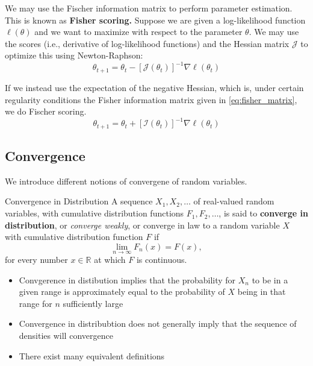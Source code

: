 \documentclass[11pt, %
	oneside, %
	english, %
	onehalfspacing, %
	]{article} %
\numberwithin{equation}{section}
\begin{document}
We may use the Fischer information matrix to perform parameter estimation. This is known as \textbf{Fisher scoring.} Suppose we are given a log-likelihood function $\ell(\theta)$ and we want to maximize with respect to the parameter $\theta$. We may use the scores (i.e., derivative of log-likelihood functions) and the Hessian matrix $\mathcal{J}$  to optimize this using Newton-Raphson:
\begin{equation*}
    \theta_{t+1}=\theta_t-\left[\mathcal{J}\left(\theta_t\right)\right]^{-1} \nabla \ell \left(\theta_t\right)
\end{equation*}

If we instead use the expectation of the negative Hessian, which is, under certain regularity conditions the Fisher information matrix given in \eqref{eq:fisher_matrix}, we do Fischer scoring.
\begin{equation*}
        \theta_{t+1}=\theta_t+\left[\mathcal{I}\left(\theta_t\right)\right]^{-1} \nabla \ell \left(\theta_t\right)
\end{equation*}






\subsection{Convergence}



We introduce different notions of convergene of random variables.

\begin{definition}{Convergence in Distribution}{}
    A sequence $X_1, X_2, \ldots$ of real-valued random variables, with cumulative distribution functions $F_1, F_2, \ldots$, is said to \textbf{converge in distribution}, or \emph{converge weakly}, or converge in law to a random variable $X$ with cumulative distribution function $F$ if
    $$
    \lim _{n \rightarrow \infty} F_n(x)=F(x),
    $$
    for every number $x \in \mathbb{R}$ at which $F$ is continuous.
\end{definition}

\begin{itemize}
    \item Convgerence in distibution implies that the probability for $X_n$ to be in a given range is approximately equal to the probability of $X$ being in that range for $n$ sufficiently large
    \item Convergence in distribubtion does not generally imply that the sequence of densities will convergence
    \item There exist many equivalent definitions
\end{itemize}
\end{document}

